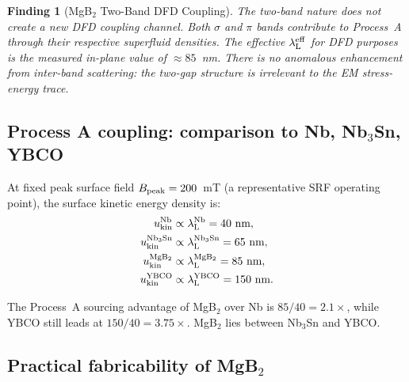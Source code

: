 \documentclass[11pt]{article}
\newtheorem{finding}{Finding}
\newcommand{\lambdaL}{\lambda_{\rm L}}
\begin{document}
\begin{finding}[MgB$_2$ Two-Band DFD Coupling]
\label{finding:mgb2-two-band}
The two-band nature does not create a new DFD coupling channel. Both
$\sigma$ and $\pi$ bands contribute to Process~A through their respective
superfluid densities. The effective $\lambdaL^{\rm eff}$ for DFD purposes
is the measured in-plane value of $\approx 85$~nm. There is no anomalous
enhancement from inter-band scattering: the two-gap structure is irrelevant
to the EM stress-energy trace.
\end{finding}

\subsection{Process A coupling: comparison to Nb, Nb$_3$Sn, YBCO}

At fixed peak surface field $B_{\rm peak} = 200$~mT (a representative SRF
operating point), the surface kinetic energy density is:
\begin{align}
u_{\rm kin}^{\rm Nb} &\propto \lambdaL^{\rm Nb} = 40~\text{nm}, \\
u_{\rm kin}^{\rm Nb_3Sn} &\propto \lambdaL^{\rm Nb_3Sn} = 65~\text{nm}, \\
u_{\rm kin}^{\rm MgB_2} &\propto \lambdaL^{\rm MgB_2} = 85~\text{nm}, \\
u_{\rm kin}^{\rm YBCO} &\propto \lambdaL^{\rm YBCO} = 150~\text{nm}.
\end{align}

The Process~A sourcing advantage of MgB$_2$ over Nb is $85/40 = 2.1\times$,
while YBCO still leads at $150/40 = 3.75\times$. MgB$_2$ lies between
Nb$_3$Sn and YBCO.

\subsection{Practical fabricability of MgB$_2$}
\end{document}
